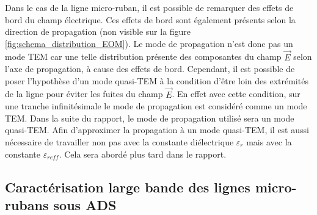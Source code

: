 \documentclass[french]{article}
\begin{document}
\newpage

Dans le cas de la ligne micro-ruban, il est possible de remarquer des effets de bord du champ électrique. Ces effets de bord sont également présents selon la direction de propagation (non visible sur la figure \ref{fig:schema_distribution_EOM}). Le mode de propagation n'est donc pas un mode TEM car une telle distribution présente des composantes du champ $\overrightarrow{E}$ selon l'axe de propagation, à cause des effets de bord. Cependant, il est possible de poser l'hypothèse d'un mode quasi-TEM à la condition d'être loin des extrémités de la ligne pour éviter les fuites du champ $\overrightarrow{E}$. En effet avec cette condition, sur une tranche infinitésimale le mode de propagation est considéré comme un mode TEM. Dans la suite du rapport, le mode de propagation utilisé sera un mode quasi-TEM. Afin d'approximer la propagation à un mode quasi-TEM, il est aussi nécessaire de travailler non pas avec la constante diélectrique $\varepsilon_r$ mais avec la constante $\varepsilon_{reff}$. Cela sera abordé plus tard dans le rapport.

\subsection{Caractérisation large bande des lignes micro-rubans sous ADS}
\end{document}
